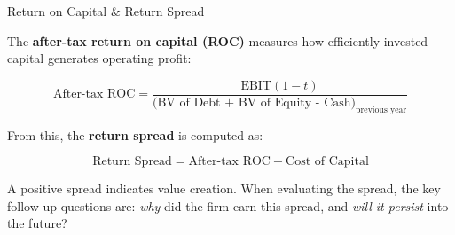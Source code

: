\documentclass[10pt]{article}
\begin{document}
    \begin{core}[label=core:roc]{Return on Capital \& Return Spread}

      The \textbf{after-tax return on capital (ROC)} measures how efficiently invested capital generates operating profit:

      \[
        \text{After-tax ROC} = \frac{\text{EBIT}(1 - t)}{\text{(BV of Debt + BV of Equity - Cash)}_{\text{previous year}}}
      \]

      From this, the \textbf{return spread} is computed as:

      \[
        \text{Return Spread} = \text{After-tax ROC} - \text{Cost of Capital}
      \]

      A positive spread indicates value creation. When evaluating the spread, the key follow-up questions are: \textit{why} did the firm earn this spread, and \textit{will it persist} into the future?


    \end{core}
\end{document}
